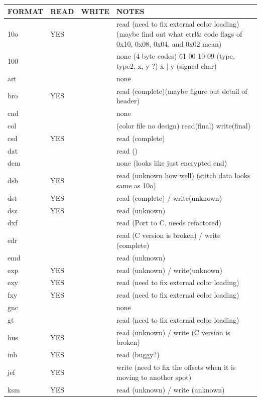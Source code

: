 \documentclass[a4paper, 11pt]{report}
\begin{document}
\begin{tabular}{l l l l}
FORMAT & READ & WRITE & NOTES \\
\hline
10o    & YES   &       & read (need to fix external color loading) (maybe find out what ctrl\& code flags of 0x10, 0x08, 0x04, and 0x02 mean) \\
100    &       &       & none (4 byte codes) 61 00 10 09 (type, type2, x, y ?) x | y (signed char) \\
art    &       &       & none \\
bro    & YES   &       & read (complete)(maybe figure out detail of header) \\
cnd    &       &       & none \\
col    &       &       & (color file no design) read(final) write(final) \\
csd    & YES   &       & read (complete) \\
dat    &       &       & read () \\
dem    &       &       & none (looks like just encrypted cnd) \\
dsb    & YES   &       & read (unknown how well) (stitch data looks same as 10o) \\
dst    & YES   &       & read (complete) / write(unknown) \\
dsz    & YES   &       & read (unknown) \\
dxf    &       &       & read (Port to C. needs refactored) \\
edr    &       &       & read (C version is broken) / write (complete) \\
emd    &       &       & read (unknown) \\
exp    & YES   &       & read (unknown) / write(unknown) \\
exy    & YES   &       & read (need to fix external color loading) \\
fxy    & YES   &       & read (need to fix external color loading) \\
gnc    &       &       & none \\
gt     &       &       & read (need to fix external color loading) \\
hus    & YES   &       & read (unknown) / write (C version is broken) \\
inb    & YES   &       & read (buggy?) \\
jef    & YES   &       & write (need to fix the offsets when it is moving to another spot) \\
ksm    & YES   &       & read (unknown) / write (unknown) \\

\end{tabular}
\end{document}
